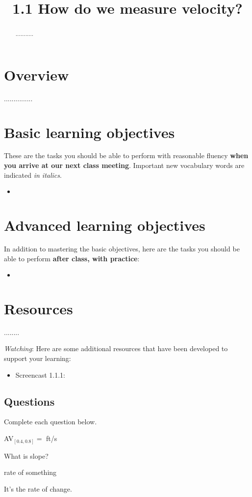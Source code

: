 \documentclass{ximera}
\title{1.1 How do we measure velocity?}
\begin{document}
\begin{abstract}
...........
\end{abstract}
\maketitle

\section{Overview}

...............


\section{Basic learning objectives}

These are the tasks you should be able to perform with reasonable fluency \textbf{when you arrive at our next class meeting}. Important new vocabulary words are indicated \emph{in italics}. 

\begin{itemize}
	\item 
\end{itemize}

\section{Advanced learning objectives}

In addition to mastering the basic objectives, here are the tasks you should be able to perform \textbf{after class, with practice}: 

\begin{itemize}
	\item 
\end{itemize}

\section{Resources}

\noindent
........

\noindent
\emph{Watching}: Here are some additional resources that have been developed to support your learning: 

\begin{itemize}
	\item Screencast 1.1.1: 
\end{itemize}

\subsection*{Questions}

\noindent Complete each question below.  

\begin{question}
AV$_{[0.4,0.8]}=$  ft/s

What is slope?
\begin{solution}
\begin{hint}
rate of something
\end{hint}
\begin{freeResponse}
It's the rate of change.
\end{freeResponse}
\end{solution}

\end{question}
\end{document}
